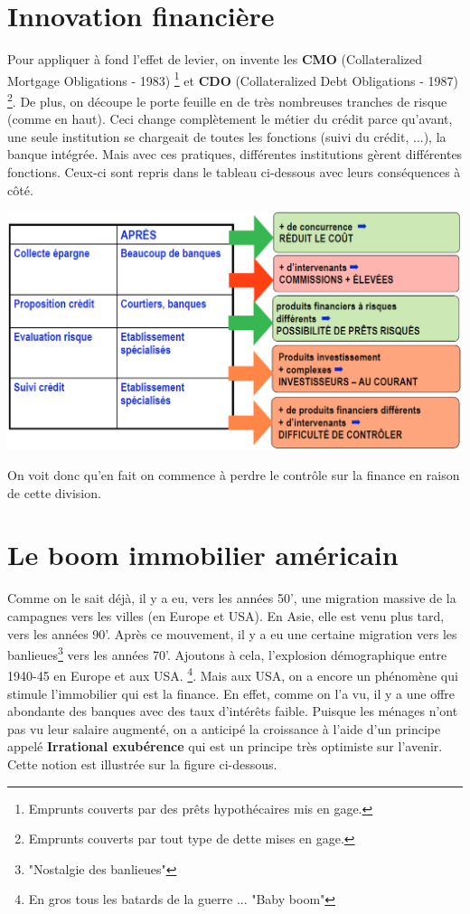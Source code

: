 \section{Innovation financière}
Pour appliquer à fond l'effet de levier, on invente les \textbf{CMO} (Collateralized Mortgage Obligations - 1983) \footnote{Emprunts couverts par des prêts hypothécaires mis en gage.} et \textbf{CDO} (Collateralized Debt Obligations - 1987) \footnote{Emprunts couverts par tout type de dette mises en gage.}. De plus, on découpe le porte feuille en de très nombreuses tranches de risque (comme en haut). Ceci change complètement le métier du crédit parce qu'avant, une seule institution se chargeait de toutes les fonctions (suivi du crédit, ...), la banque intégrée. Mais avec ces pratiques, différentes institutions gèrent différentes fonctions. Ceux-ci sont repris dans le tableau ci-dessous avec leurs conséquences à côté.

\begin{center}
\includegraphics[scale=0.4]{5}
\end{center}

On voit donc qu'en fait on commence à perdre le contrôle sur la finance en raison de cette division. 

\section{Le boom immobilier américain}
Comme on le sait déjà, il y a eu, vers les années 50', une migration massive de la campagnes vers les villes (en Europe et USA). En Asie, elle est venu plus tard, vers les années 90'. Après ce mouvement, il y a eu une certaine migration vers les banlieues\footnote{"Nostalgie des banlieues"} vers les années 70'. Ajoutons à cela, l'explosion démographique entre 1940-45 en Europe et aux USA. \footnote{En gros tous les batards de la guerre ... "Baby boom"}. Mais aux USA, on a encore un phénomène qui stimule l'immobilier qui est la finance. En effet, comme on l'a vu, il y a une offre abondante des banques avec des taux d'intérêts faible. Puisque les ménages n'ont pas vu leur salaire augmenté, on a anticipé la croissance à l'aide d'un principe appelé \textbf{Irrational exubérence} qui est un principe très optimiste sur l'avenir. Cette notion est illustrée sur la figure ci-dessous.

